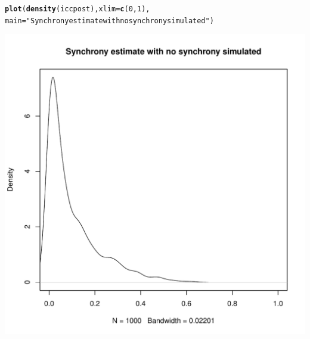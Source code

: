 \documentclass[a4paper, 10pt]{scrartcl}\usepackage[]{graphicx}\usepackage[]{color}
\makeatletter
\def\maxwidth{ %
  \ifdim\Gin@nat@width>\linewidth
    \linewidth
  \else
    \Gin@nat@width
  \fi
}
\newcommand{\hlnum}[1]{\textcolor[rgb]{0.686,0.059,0.569}{#1}}%
\newcommand{\hlstr}[1]{\textcolor[rgb]{0.192,0.494,0.8}{#1}}%
\newcommand{\hlstd}[1]{\textcolor[rgb]{0.345,0.345,0.345}{#1}}%
\newcommand{\hlkwc}[1]{\textcolor[rgb]{0.333,0.667,0.333}{#1}}%
\newcommand{\hlkwd}[1]{\textcolor[rgb]{0.737,0.353,0.396}{\textbf{#1}}}%
\newenvironment{kframe}{%
 \def\at@end@of@kframe{}%
 \ifinner\ifhmode%
  \def\at@end@of@kframe{\end{minipage}}%
  \begin{minipage}{\columnwidth}%
 \fi\fi%
 \def\FrameCommand##1{\hskip\@totalleftmargin \hskip-\fboxsep
 \colorbox{shadecolor}{##1}\hskip-\fboxsep
     \hskip-\linewidth \hskip-\@totalleftmargin \hskip\columnwidth}%
 \MakeFramed {\advance\hsize-\width
   \@totalleftmargin\z@ \linewidth\hsize
   \@setminipage}}%
 {\par\unskip\endMakeFramed%
 \at@end@of@kframe}
\newenvironment{knitrout}{}{} %
\makeatother
\begin{document}
\begin{knitrout}
\begin{kframe}\begin{alltt}
\hlkwd{plot}\hlstd{(}\hlkwd{density}\hlstd{(iccpost),} \hlkwc{xlim} \hlstd{=} \hlkwd{c}\hlstd{(}\hlnum{0}\hlstd{,}\hlnum{1}\hlstd{),}
     \hlkwc{main}\hlstd{=}\hlstr{"Synchrony estimate with no synchrony simulated"}\hlstd{)}
\end{alltt}
\end{kframe}
\includegraphics[width=\maxwidth]{figure/unnamed-chunk-22-2} 

\end{knitrout}
\end{document}
